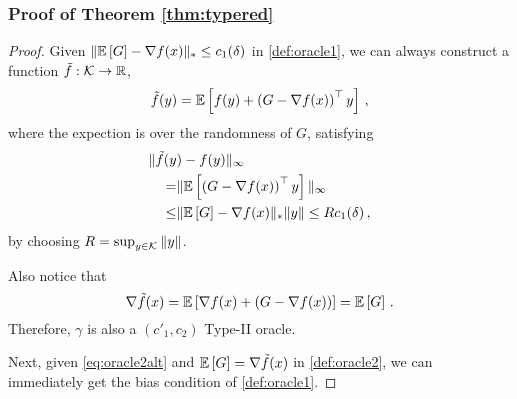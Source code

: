 
\subsubsection*{Proof of Theorem \ref{thm:typered}}
\begin{proof}
Given $\| \mathbb{E}\left[G\right]  - \nabla f(x)  \|_* \le c_1(\delta) $ in \cref{def:oracle1}, we can always construct a function $\tilde{f}:\mathcal{K} \to \mathbb{R}$, 
\[
\tilde{f}(y) =\mathbb{E}\left[ f(y)+ \left( G-\nabla f(x) \right)^\top y\right] \,, 
\]
where the expection is over the randomness of $G$, satisfying
\begin{align*}
\MoveEqLeft
\norm{\tilde{f}(y)-f(y)}_{\infty} \\
= &
 \norm{ \EE{\left( G-\nabla f(x) \right)^\top y}}_{\infty}\\
 \le &\norm{\EE{G}-\nabla f(x)}_* \norm{y}
 \le  Rc_1(\delta)\,,
\end{align*} 
by choosing $R = \sup_{y \in \mathcal{K}}\|y\|$.

Also notice that
\[
 \nabla \tilde{f}(x) = \mathbb{E}\left[\nabla f(x)+ \left( G-\nabla f(x)\right)\right]
 =\mathbb{E}\left[G\right]\,.
\]
Therefore, $\gamma$ is also a $(c'_1,c_2)$ Type-II oracle.

Next, given \eqref{eq:oracle2alt} and $\mathbb{E}\left[G\right]=\nabla \tilde{f}(x)$ in \cref{def:oracle2}, we can immediately get the bias condition of \cref{def:oracle1}. 
\end{proof}

